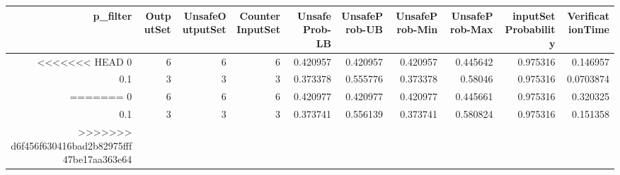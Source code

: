 \begin{tabular}{rrrrrrrrrr}
\hline
   p\_filter &   OutputSet &   UnsafeOutputSet &   CounterInputSet &   UnsafeProb-LB &   UnsafeProb-UB &   UnsafeProb-Min &   UnsafeProb-Max &   inputSet Probability &   VerificationTime \\
\hline
<<<<<<< HEAD
        0   &           6 &                 6 &                 6 &        0.420957 &        0.420957 &         0.420957 &         0.445642 &               0.975316 &          0.146957  \\
        0.1 &           3 &                 3 &                 3 &        0.373378 &        0.555776 &         0.373378 &         0.58046  &               0.975316 &          0.0703874 \\
=======
        0   &           6 &                 6 &                 6 &        0.420977 &        0.420977 &         0.420977 &         0.445661 &               0.975316 &           0.320325 \\
        0.1 &           3 &                 3 &                 3 &        0.373741 &        0.556139 &         0.373741 &         0.580824 &               0.975316 &           0.151358 \\
>>>>>>> d6f456f630416bad2b82975fff47be17aa363e64
\hline
\end{tabular}
